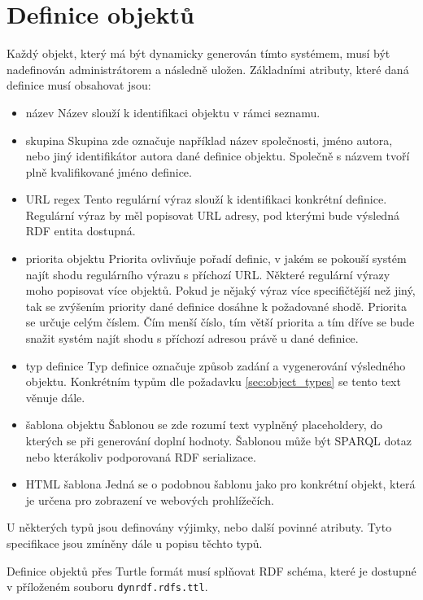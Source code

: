\documentclass[thesis=B,czech]{FITthesis}[2012/06/26]
\begin{document}
 \section{Definice objektů}\label{obj_def}
  Každý objekt, který má být dynamicky generován tímto systémem, musí být nadefinován administrátorem a následně uložen.
  Základními atributy, které daná definice musí obsahovat jsou:
  \begin{itemize}
    \item název
      \subitem Název slouží k identifikaci objektu v rámci seznamu.
    \item skupina
      \subitem Skupina zde označuje například název společnosti, jméno autora, nebo jiný identifikátor autora dané definice objektu. 
      Společně s názvem tvoří plně kvalifikované jméno definice.
    \item URL regex
      \subitem Tento regulární výraz slouží k identifikaci konkrétní definice. Regulární výraz by měl popisovat URL adresy, pod kterými bude výsledná RDF entita
      dostupná.
    \item priorita objektu
      \subitem Priorita ovlivňuje pořadí definic, v jakém se pokouší systém najít shodu regulárního výrazu s příchozí URL. Některé regulární
      výrazy moho popisovat více objektů. Pokud je nějaký výraz více specifičtější než jiný, tak se zvýšením priority dané definice dosáhne k požadované shodě.
      Priorita se určuje celým číslem. Čím menší číslo, tím větší priorita a tím dříve se bude snažit systém najít shodu s příchozí adresou právě u dané definice.
      
    \item typ definice
      \subitem Typ definice označuje způsob zadání a vygenerování výsledného objektu. Konkrétním typům dle požadavku \ref{sec:object_types} se tento text věnuje dále.
    \item šablona objektu
      \subitem Šablonou se zde rozumí text vyplněný placeholdery, do kterých se při generování doplní hodnoty. Šablonou může být SPARQL dotaz nebo kterákoliv 
      podporovaná RDF serializace.
      
    \item HTML šablona
      \subitem Jedná se o podobnou šablonu jako pro konkrétní objekt, která je určena pro zobrazení ve webových prohlížečích.    
 \end{itemize}
 U některých typů jsou definovány výjimky, nebo další povinné atributy. Tyto specifikace jsou zmíněny dále u popisu těchto typů.
 
 Definice objektů přes Turtle formát musí splňovat RDF schéma, které je dostupné v příloženém souboru \texttt{dynrdf.rdfs.ttl}.
 
\end{document}
